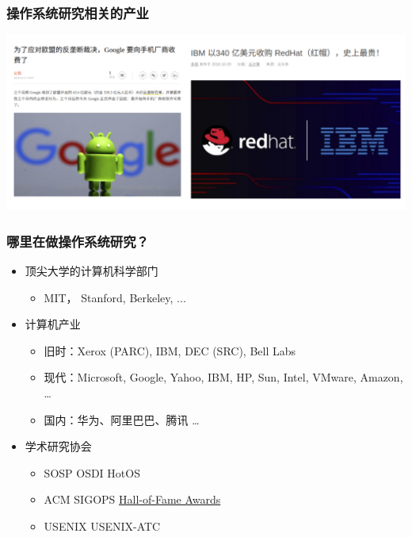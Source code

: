 \begin{frame}
    \frametitle{操作系统研究相关的产业}
     \includegraphics[width=1.0\linewidth]{companies-os}
\end{frame}

    
\begin{frame}
    \frametitle{哪里在做操作系统研究？}
    \begin{itemize}
        \item 顶尖大学的计算机科学部门
         \begin{itemize}
        	\item MIT， Stanford, Berkeley, ...
         \end{itemize} \pause
        \item 计算机产业
        \begin{itemize}
            \item 旧时：Xerox (PARC), IBM, DEC (SRC), Bell Labs
            \item 现代：Microsoft, Google, Yahoo, IBM, HP, Sun, Intel, VMware, Amazon,  …
            \item 国内：华为、阿里巴巴、腾讯 …
        \end{itemize}\pause

        \item 学术研究协会
        \begin{itemize}
            \item SOSP OSDI HotOS
            \item ACM SIGOPS \href{http://www.sigops.org/award-hof.html}{Hall-of-Fame Awards} 
            \item USENIX USENIX-ATC
        \end{itemize}
    \end{itemize}
\end{frame}



